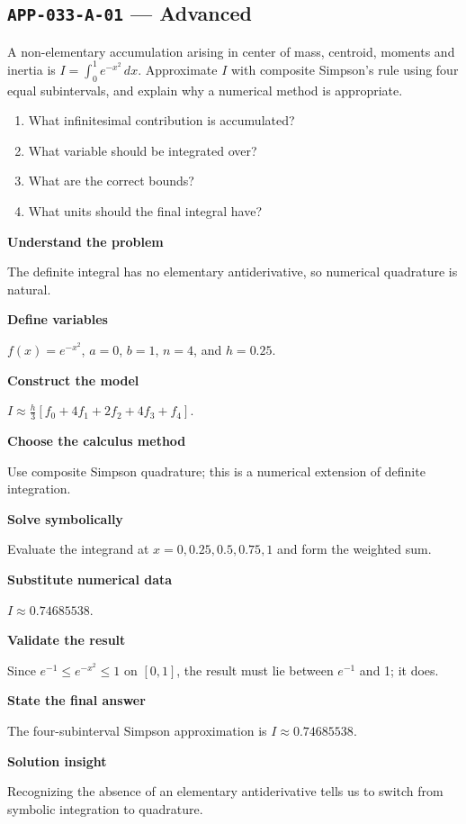\documentclass[11pt]{book}
\newcommand{\pid}[1]{\texttt{#1}}
\begin{document}
\subsection*{\pid{APP-033-A-01} — Advanced}
\begin{problembox}
A non-elementary accumulation arising in center of mass, centroid, moments and inertia is $I=\int_0^1 e^{-x^2}\,dx$. Approximate $I$ with composite Simpson's rule using four equal subintervals, and explain why a numerical method is appropriate.
\end{problembox}
\begin{promptbox}\begin{enumerate}
\item What infinitesimal contribution is accumulated?
\item What variable should be integrated over?
\item What are the correct bounds?
\item What units should the final integral have?
\end{enumerate}\end{promptbox}
\begin{solutionbox}
\textbf{Understand the problem}\par The definite integral has no elementary antiderivative, so numerical quadrature is natural.\par\medskip
\textbf{Define variables}\par $f(x)=e^{-x^2}$, $a=0$, $b=1$, $n=4$, and $h=0.25$.\par\medskip
\textbf{Construct the model}\par $I\approx\frac{h}{3}[f_0+4f_1+2f_2+4f_3+f_4]$.\par\medskip
\textbf{Choose the calculus method}\par Use composite Simpson quadrature; this is a numerical extension of definite integration.\par\medskip
\textbf{Solve symbolically}\par Evaluate the integrand at $x=0,0.25,0.5,0.75,1$ and form the weighted sum.\par\medskip
\textbf{Substitute numerical data}\par $I\approx 0.74685538$.\par\medskip
\textbf{Validate the result}\par Since $e^{-1}\le e^{-x^2}\le1$ on $[0,1]$, the result must lie between $e^{-1}$ and 1; it does.\par\medskip
\textbf{State the final answer}\par The four-subinterval Simpson approximation is $I\approx 0.74685538$.\par\medskip
\textbf{Solution insight}\par Recognizing the absence of an elementary antiderivative tells us to switch from symbolic integration to quadrature.\par\medskip
\end{solutionbox}
\end{document}
